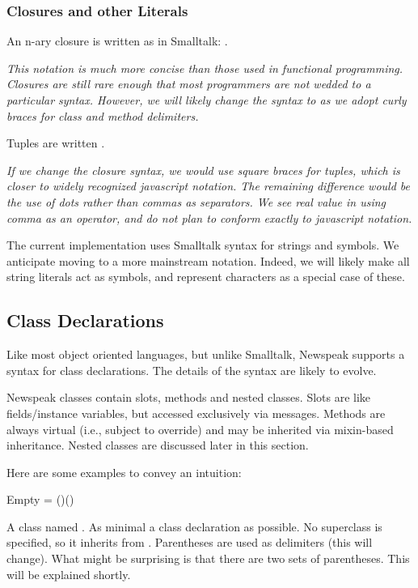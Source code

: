 \documentclass{article}
\begin{document}
\subsubsection{Closures and other Literals}

An n-ary closure is written as in Smalltalk: \cd{[:p1 ... :pN $|$ body]}. 

{\it
This notation is much more concise than those used in functional programming. Closures are still rare enough that most programmers are not wedded to a particular syntax. However, we will likely change the syntax to
 as we adopt curly braces for class and method delimiters.
}

Tuples are written .

{\it
 If we change the closure syntax, we would use square braces for tuples, which is closer to widely recognized javascript notation. The remaining difference would be the use of dots rather than commas as separators. We see real value in using comma as an operator, and do not plan to conform exactly to javascript notation.
}


The current implementation uses Smalltalk syntax for strings and symbols. We anticipate moving to a more mainstream notation. Indeed, we will likely make all string literals act as symbols, and represent characters as a special case of these.

\subsection{Class Declarations}

Like most object oriented languages, but unlike Smalltalk, Newspeak supports a syntax for class declarations.  The details of the syntax are likely to evolve. 

Newspeak classes contain slots, methods and nested classes. Slots are like fields/instance variables, but accessed exclusively via messages. Methods are always virtual (i.e., subject to override) and may be inherited via mixin-based inheritance. Nested classes are discussed later in this section. 

Here are some examples to convey an intuition:

\begin{newspeak}
\CLASS Empty = ()()
\end{newspeak}

A class named . As minimal a class declaration as possible.  No superclass is specified, so it inherits from .
Parentheses are used as delimiters (this will change). What might be surprising is that there are two sets of parentheses. This will be explained shortly.
\end{document}
